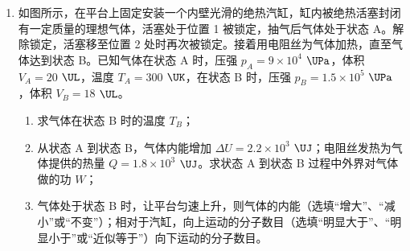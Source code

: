 \documentclass[\gkver]{gaokaozhenti}
\begin{document}
\begin{enumerate}
{金属丝总长度为 $n\cdot\pi d$（每匝金属丝的周长为 $\pi d$，共 $n$ 匝），金属丝横截面积 $S=\pi\left(\frac{d_{\text{丝}}}{2}\right)^{2}$，绕线部分总长度 $L=nd_{\text{丝}}$，代入电阻定律 $R_{1}=\rho\frac{l_{\text{总}}}{S}$ 化简后可得该表达式 $\rho=\frac{R_{1}L^{2}}{4n^{3}d}$。

代入数值估算可得 $\rho\approx6\times10^{-7}$ $\UOm$

故选 B。

（4）不合理。

$R_{2}\approx10$ $\UO$ 阻值太小，分压电阻太大，电路中电流变化范围极小，多用电表 10 $\UmA$ 电流挡的读数误差很大。
}

\item
如图所示，在平台上固定安装一个内壁光滑的绝热汽缸，缸内被绝热活塞封闭有一定质量的理想气体，活塞处于位置 1 被锁定，抽气后气体处于状态 A。解除锁定，活塞移至位置 2 处时再次被锁定。接着用电阻丝为气体加热，直至气体达到状态 B。已知气体在状态 A 时，压强 $p_{A}=9\times10^{4}$ $\UPa$，体积 $V_{A}=20$ $\UL$，温度 $T_{A}=300$ $\UK$，在状态 B 时，压强 $p_{B}=1.5\times10^{5}$ $\UPa$，体积 $V_{B}=18$ $\UL$。
\begin{enumerate}
	\item
	求气体在状态 B 时的温度 $T_{B}$；
	\item
	从状态 A 到状态 B，气体内能增加 $\Delta U=2.2\times10^{3}$ $\UJ$；电阻丝发热为气体提供的热量 $Q=1.8\times10^{3}$ $\UJ$。求状态 A 到状态 B 过程中外界对气体做的功 $W$；
	\item
	气体处于状态 B 时，让平台匀速上升，则气体的内能（选填“增大”、“减小”或“不变”）；相对于汽缸，向上运动的分子数目（选填“明显大于”、“明显小于”或“近似等于”）向下运动的分子数目。
\end{enumerate}
\end{enumerate}
\end{document}
